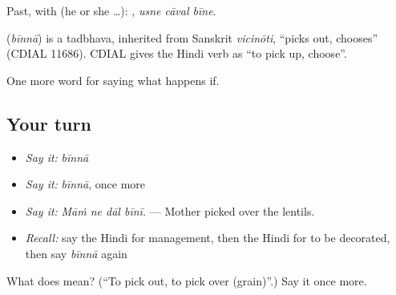 Past, with  (he or she …):   , \emph{usne cāval bīne}.

\begin{cousinweb}
\textbf{} (\emph{bīnnā}) is a tadbhava, inherited from Sanskrit \emph{vicinōti}, \textquotedblleft{}picks out, chooses\textquotedblright{} (CDIAL 11686). CDIAL gives the Hindi verb as \textquotedblleft{}to pick up, choose\textquotedblright{}.
\end{cousinweb}

\begin{grammarlens}[title={What you've built}]
One more word for saying what happens if.
\end{grammarlens}

\subsection*{Your turn}
\begin{itemize}
\raggedright
  \item \emph{Say it:} \emph{bīnnā}
  \item \emph{Say it:} \emph{bīnnā}, once more
  \item \emph{Say it:} \emph{Māṁ ne dāl bīnī.} — Mother picked over the lentils.
  \item \emph{Recall:} say the Hindi for management, then the Hindi for to be decorated, then say \emph{bīnnā} again
\end{itemize}

\begin{tcolorbox}[breakable,colback=teal!4,colframe=teal!35!black,title={Before you move on}]
What does  mean? (\textquotedblleft{}To pick out, to pick over (grain)\textquotedblright{}.) Say it once more.
\end{tcolorbox}
